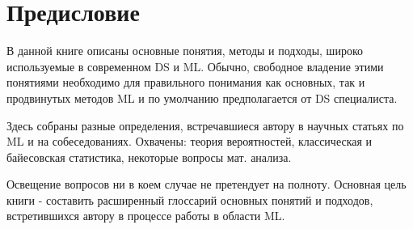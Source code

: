 \chapter*{Предисловие}

В данной книге описаны основные понятия, методы и подходы, широко используемые в современном DS и ML. Обычно, свободное владение этими понятиями необходимо для правильного понимания как основных, так и продвинутых методов ML и по умолчанию предполагается от DS специалиста.

Здесь собраны разные определения, встречавшиеся автору в научных статьях по ML и на собеседованиях. Охвачены: теория вероятностей, классическая и байесовская статистика, некоторые вопросы мат. анализа.

Освещение вопросов ни в коем случае не претендует на полноту. Основная цель книги - составить расширенный глоссарий основных понятий и подходов, встретившихся автору в процессе работы в области ML.
